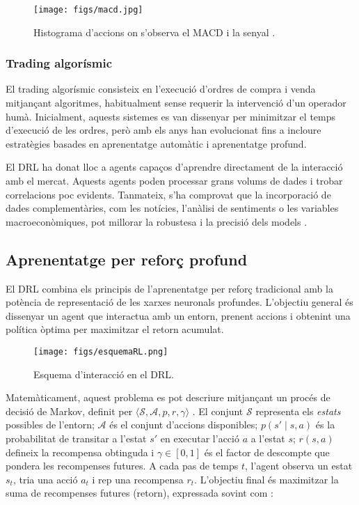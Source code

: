 \documentclass[12pt,a4paper,twoside]{book}
\begin{document}
\begin{figure}[H]
	\centering
	\texttt{[image: figs/macd.jpg]}
	\caption{Histograma d'accions on s'observa el MACD i la senyal \cite{InvestopediaMACD}.}
	\label{fig:context-anoni1}
\end{figure}

\subsubsection{Trading algorísmic}
El trading algorísmic consisteix en l'execució d'ordres de compra i venda mitjançant algoritmes, habitualment sense requerir la intervenció d'un operador humà. Inicialment, aquests sistemes es van dissenyar per minimitzar el temps d'execució de les ordres, però amb els anys han evolucionat fins a incloure estratègies  basades en aprenentatge automàtic i aprenentatge profund\cite{Origins}.

El DRL ha donat lloc a agents capaços d'aprendre directament de la interacció amb el mercat. Aquests agents poden processar grans volums de dades i trobar correlacions poc evidents. Tanmateix, s'ha comprovat que la incorporació de dades complementàries, com les notícies, l'anàlisi de sentiments o les variables macroeconòmiques, pot millorar la robustesa i la precisió dels models \cite{DBLP}.



\subsection{Aprenentatge per reforç profund}

El DRL combina els principis de l'aprenentatge per reforç tradicional amb la potència de representació de les xarxes neuronals profundes. L'objectiu general és dissenyar un agent que interactua amb un entorn, prenent accions i obtenint una política òptima per maximitzar el retorn acumulat.


\begin{figure}[H]
	\centering
	\texttt{[image: figs/esquemaRL.png]}
	\caption{Esquema d'interacció en el DRL\cite{esquemaRL}.}
	\label{fig:context-anoni1}
\end{figure}


Matemàticament, aquest problema es pot descriure mitjançant un procés de decisió de Markov, definit per $\langle \mathcal{S}, \mathcal{A}, p, r, \gamma\rangle$ \cite{DRLIntro}. El conjunt $\mathcal{S}$ representa els \emph{estats} possibles de l'entorn; $\mathcal{A}$ és el conjunt d'accions disponibles; $p(s' \mid s,a)$ és la probabilitat de transitar a l'estat $s'$ en executar l'acció $a$ a l'estat $s$; $r(s,a)$ defineix la recompensa obtinguda i $\gamma \in [0,1]$ és el factor de descompte que pondera les recompenses futures. A cada pas de temps $t$, l'agent observa un estat $s_t$, tria una acció $a_t$ i rep una recompensa $r_t$. L'objectiu final és maximitzar la suma de recompenses futures (retorn), expressada sovint com \cite{RLIntro}:
\end{document}
